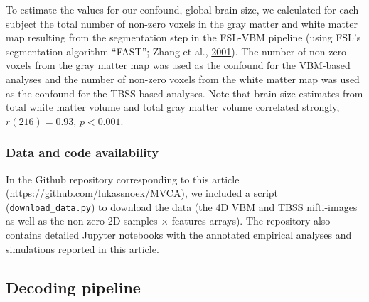 \documentclass[12pt,american,a4paper,oneside,]{memoir} %
\begin{document}
To estimate the values for our confound, global brain size, we calculated for each subject the total number of non-zero voxels in the gray matter and white matter map resulting from the segmentation step in the FSL-VBM pipeline (using FSL's segmentation algorithm ``FAST''; Zhang et al., \protect\hyperlink{ref-Zhang2001-wa}{2001}). The number of non-zero voxels from the gray matter map was used as the confound for the VBM-based analyses and the number of non-zero voxels from the white matter map was used as the confound for the TBSS-based analyses. Note that brain size estimates from total white matter volume and total gray matter volume correlated strongly, \(r (216) = 0.93\), \(p < 0.001\).

\hypertarget{confounds-decoding-methods-data-data-and-code}{%
\subsubsection{Data and code availability}\label{confounds-decoding-methods-data-data-and-code}}

In the Github repository corresponding to this article (\url{https://github.com/lukassnoek/MVCA}), we included a script (\texttt{download\_data.py}) to download the data (the 4D VBM and TBSS nifti-images as well as the non-zero 2D samples × features arrays). The repository also contains detailed Jupyter notebooks with the annotated empirical analyses and simulations reported in this article.

\hypertarget{confounds-decoding-methods-pipeline}{%
\subsection{Decoding pipeline}\label{confounds-decoding-methods-pipeline}}
\end{document}
